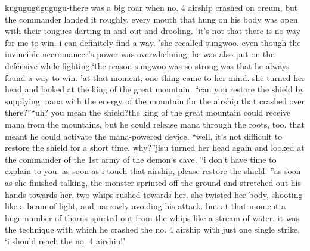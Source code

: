 kugugugugugugu-there was a big roar when no.
 4 airship crashed on oreum, but the commander landed it roughly.
 every mouth that hung on his body was open with their tongues darting in and out and drooling.
‘it’s not that there is no way for me to win.
 i can definitely find a way.
’she recalled sungwoo.
 even though the invincible necromancer’s power was overwhelming, he was also put on the defensive while fighting,‘the reason sungwoo was so strong was that he always found a way to win.
’at that moment, one thing came to her mind.
 she turned her head and looked at the king of the great mountain.
“can you restore the shield by supplying mana with the energy of the mountain for the airship that crashed over there?”“uh? you mean the shield?the king of the great mountain could receive mana from the mountains, but he could release mana through the roots, too.
 that meant he could activate the mana-powered device.
“well, it’s not difficult to restore the shield for a short time.
 why?”jisu turned her head again and looked at the commander of the 1st army of the demon’s cave.
“i don’t have time to explain to you.
 as soon as i touch that airship, please restore the shield.
”as soon as she finished talking, the monster sprinted off the ground and stretched out his hands towards her.
two whips rushed towards her.
 she twisted her body, shooting like a beam of light, and narrowly avoiding his attack.
but at that moment a huge number of thorns spurted out from the whips like a stream of water.
 it was the technique with which he crashed the no.
 4 airship with just one single strike.
‘i should reach the no.
 4 airship!’

 
